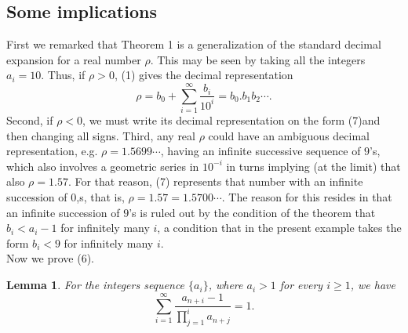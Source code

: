 \documentclass[12pt]{article}
\newtheorem{lemma*}{Lemma}
\begin{document}
\subsection{Some implications}
First we remarked that Theorem 1 is a generalization of the standard decimal expansion for a real number $\rho$. This may be seen by taking all the integers $a_i = 10$. Thus, if $\rho > 0$, (1) gives the decimal representation
\begin{equation}
\rho = b_0 + \sum_{i=1}^\infty \frac{b_i}{10^i} = b_0.b_1b_2 \cdots.
\end{equation}
Second, if $\rho <0$, we must write its decimal representation on the form (7)and then changing all signs.
Third, any real $\rho$ could have an ambiguous decimal representation, e.g. $\rho = 1.5699 \cdots$, having an infinite successive sequence of $9$'s, which also involves a geometric series in $10^{-i}$ in turns implying (at the limit) that also $\rho = 1.57$. For that reason, (7) represents that number with an infinite succession of $0$,s, that is, $\rho = 1.57 = 1.5700\cdots$. The reason for this resides in that an infinite succession of $9$'s  is ruled out by the condition of the theorem that $b_i < a_i - 1$ for infinitely many $i$, a condition that in the present example takes the form $b_i < 9$ for infinitely many $i$. \\     
Now we prove (6).
\begin{lemma*}
For the integers sequence $\{a_i\}$, where $a_i > 1$ for every $i \geq 1$, we have
\begin{equation*}
\sum_{i=1}^\infty \frac{a_{n+i}-1}{\prod_{j=1}^i a_{n+j}} = 1.
\end{equation*}
\end{lemma*}
\end{document}
